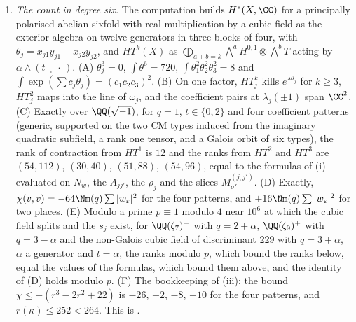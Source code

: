 \begin{enumerate}[label=\textup{(\Roman*)},leftmargin=*]
  $\QQ(\sqrt{-1})$ and the quartic profile as controls; and the identities
  used in the proof of , on random integral classes.
  Further, for , the four identities at $n=1$ and $n=2$
  with $d$ a symbol; for , the Euler characteristic
  of a secant class and the numbers $R_{n}$ for $n\le12$; for
  , the profiles of part (i) for $5\le n\le24$ on
  $4320$ secant characters, the series identities of parts (ii) and (iv) with
  $b$, $d$ and $r$ as symbols, the counts of part (iii) for $n\le39$, and
  the inequality closing part (iv); for
  , the dimensions of the $\SO(t)$- and $\mathrm{O}(t)$-invariants of $V^{\otimes j}$,
  equal for $j<t$ and differing by one at $j=t$, for $t\le8$, with the
  determinant invariant and odd under reflections; and for
  , the closure graph with the implication
  $\textup{(F3$'$)}\Rightarrow\textup{(M)}$ added, which has the same five
  minimal sufficient sets as the rule set of item (XXXIII).

\item \emph{The count in degree six.} The computation builds $H^{*}(X,\CC)$
  for a principally polarised abelian sixfold with real multiplication by a
  cubic field as the exterior algebra on twelve generators in three blocks of
  four, with $\theta_{j}=x_{j1}y_{j1}+x_{j2}y_{j2}$, and $HT^{k}(X)$ as
  $\bigoplus_{a+b=k}\bigwedge^{a}H^{0,1}\otimes\bigwedge^{b}T$ acting by
  $\alpha\wedge(t\lrcorner\,\cdot\,)$. (A) $\theta_{j}^{3}=0$,
  $\int\theta^{6}=720$, $\int\theta_{1}^{2}\theta_{2}^{2}\theta_{3}^{2}=8$ and
  $\int\exp(\sum c_{j}\theta_{j})=(c_{1}c_{2}c_{3})^{2}$. (B) On one factor,
  $HT^{k}_{j}$ kills $e^{\lambda\theta_{j}}$ for $k\ge3$, $HT^{2}_{j}$ maps
  into the line of $\omega_{j}$, and the coefficient pairs at
  $\lambda_{j}(\pm1)$ span $\CC^{2}$. (C) Exactly over $\QQ(\sqrt{-1})$, for
  $q=1$, $t\in\{0,2\}$ and four coefficient patterns (generic, supported on
  the two CM types induced from the imaginary quadratic subfield, a rank one
  tensor, and a Galois orbit of six types), the rank of contraction from
  $HT^{1}$ is $12$ and the ranks from $HT^{2}$ and $HT^{3}$ are $(54,112)$,
  $(30,40)$, $(51,88)$, $(54,96)$, equal to the formulas of (i) evaluated on
  $N_{w}$, the $A_{jj'}$, the $\rho_{j}$ and the slices $M^{(j;j')}_{\sigma'}$.
  (D) Exactly, $\chi(v,v)=-64\Nm(q)\sum|w_{\varepsilon}|^{2}$ for the four
  patterns, and $+16\Nm(q)\sum|w_{\varepsilon}|^{2}$ for two places. (E) Modulo
  a prime $p\equiv1$ modulo $4$ near $10^{6}$ at which the cubic field splits
  and the $s_{j}$ exist, for $\QQ(\zeta_{7})^{+}$ with $q=2+\alpha$,
  $\QQ(\zeta_{9})^{+}$ with $q=3-\alpha$ and the non-Galois cubic field of
  discriminant $229$ with $q=3+\alpha$, $\alpha$ a generator and $t=\alpha$,
  the ranks modulo $p$, which bound the ranks below, equal the values of the
  formulas, which bound them above, and the identity of (D) holds modulo
  $p$. (F) The bookkeeping of (iii): the bound
  $\chi\le-(r^{3}-2r^{2}+22)$ is $-26$, $-2$, $-8$, $-10$ for the four
  patterns, and $r(\kappa)\le252<264$. This is .


\end{enumerate}
